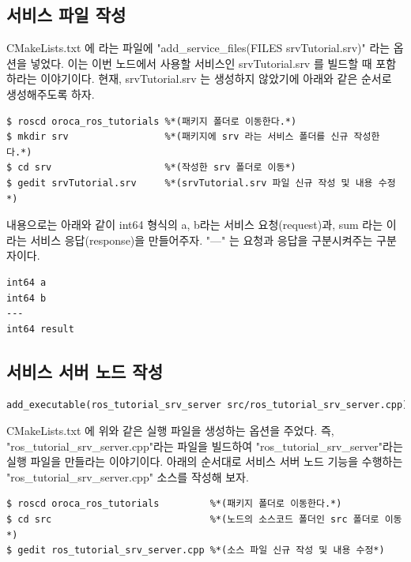 \subsection{서비스 파일 작성}

CMakeLists.txt 에 라는 파일에 "add\_service\_files(FILES srvTutorial.srv)" 라는 옵션을 넣었다. 이는 이번 노드에서 사용할 서비스인 srvTutorial.srv 를 빌드할 때 포함하라는 이야기이다. 현재, srvTutorial.srv 는 생성하지 않았기에 아래와 같은 순서로 생성해주도록 하자.

\begin{lstlisting}[language=ROS]
$ roscd oroca_ros_tutorials %*(패키지 폴더로 이동한다.*)
$ mkdir srv                 %*(패키지에 srv 라는 서비스 폴더를 신규 작성한다.*)
$ cd srv                    %*(작성한 srv 폴더로 이동*)
$ gedit srvTutorial.srv     %*(srvTutorial.srv 파일 신규 작성 및 내용 수정*)
\end{lstlisting}

내용으로는 아래와 같이 int64 형식의 a, b라는 서비스 요청(request)과, sum 라는 이라는 서비스 응답(response)을 만들어주자. "---" 는 요청과 응답을 구분시켜주는 구분자이다.

\begin{lstlisting}[language=ROS]
int64 a
int64 b
---
int64 result
\end{lstlisting}

\subsection{서비스 서버 노드 작성}

\begin{lstlisting}[language=make]
add_executable(ros_tutorial_srv_server src/ros_tutorial_srv_server.cpp)
\end{lstlisting}

CMakeLists.txt 에 위와 같은 실행 파일을 생성하는 옵션을 주었다. 즉, "ros\_tutorial\_srv\_server.cpp"라는 파일을 빌드하여 "ros\_tutorial\_srv\_server"라는 실행 파일을 만들라는 이야기이다. 아래의 순서대로 서비스 서버 노드 기능을 수행하는 "ros\_tutorial\_srv\_server.cpp" 소스를 작성해 보자. 

\begin{lstlisting}[language=ROS]
$ roscd oroca_ros_tutorials         %*(패키지 폴더로 이동한다.*)
$ cd src                            %*(노드의 소스코드 폴더인 src 폴더로 이동*)
$ gedit ros_tutorial_srv_server.cpp %*(소스 파일 신규 작성 및 내용 수정*)
\end{lstlisting}

